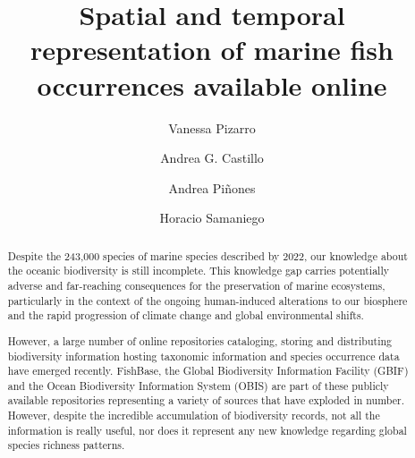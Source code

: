 \documentclass[12pt,authoryear]{elsarticle}
\begin{document}
\begin{frontmatter}

  \title{
    Spatial and temporal representation of marine fish occurrences available online
  } 
  \author[ecoinfo]{Vanessa Pizarro}
  \author[ecoinfo,uach]{Andrea G. Castillo}
  \author[icml,FONDAP,COPAS,BASE]{Andrea Pi\~nones}
  \author[ecoinfo,iscv]{Horacio Samaniego}

  \address[ecoinfo]{Laboratorio de Ecoinform\'atica, Instituto de Conservación, Biodiversidad y Territorio, Universidad Austral de Chile, Valdivia, Chile}

  \address [uach] {Programa de Doctorado en Ciencias mención Ecología y Evolución, Escuela de Graduados, Facultad de Ciencias, Universidad Austral de Chile, Valdivia, Chile}
  \address[icml] {Instituto de Ciencias Marinas y Limnológicas, Facultad de Ciencias, Universidad Austral de Chile, Valdivia, Chile}
  \address[FONDAP]{Centro FONDAP de Investigación en Dinámica de Ecosistemas Marinos de Altas Latitudes (IDEAL), Valdivia, Chile}
  \address[COPAS]{Centro de Investigaci\'on Oceanogr\'afica COPAS-COASTAL, Universidad de Concepci\'on, Chile}
  \address[BASE]{Millenium Institute Biodiversity of Antarctic and Subantarctic Ecosystems - BASE, Chile}
  \address[iscv]{Instituto de Sistemas Complejos de Valpara\'iso, Subida Artiller\'ia 470, Valpara\'iso, Chile}


\linenumbers
\singlespacing

\begin{abstract} 

Despite the 243,000 species of  marine species described by 2022, our knowledge about the oceanic biodiversity is still incomplete. This knowledge gap carries potentially adverse and far-reaching consequences for the preservation of marine ecosystems, particularly in the context of the ongoing human-induced alterations to our biosphere and the rapid progression of climate change and global environmental shifts.

However, a large number of online repositories cataloging, storing and distributing biodiversity information hosting taxonomic information and species occurrence data have emerged recently. FishBase, the Global Biodiversity Information Facility (GBIF) and the Ocean Biodiversity Information System (OBIS) are part of these publicly available repositories  representing a variety of sources that have exploded in number. However, despite the incredible accumulation of biodiversity records, not all the information is really useful, nor does it represent any new knowledge regarding global species richness patterns.


\end{abstract}
\end{frontmatter}
\end{document}

